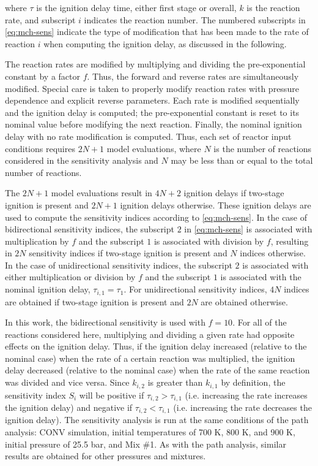 \documentclass[12pt, letterpaper]{article}
\begin{document}
where $\tau$ is the ignition delay time, either first stage or overall, $k$ is 
the reaction rate, and subscript $i$ indicates the reaction number. The 
numbered subscripts in \autoref{eq:mch-sens} indicate the type of modification 
that has been made to the rate of reaction $i$ when computing the ignition 
delay, as discussed in the following.

The reaction rates are modified by multiplying and dividing the pre-exponential 
constant by a factor $f$. Thus, the forward and reverse rates are 
simultaneously modified. Special care is taken to properly modify reaction 
rates with pressure dependence and explicit reverse parameters. Each rate is 
modified sequentially and the ignition delay is computed; the pre-exponential 
constant is reset to its nominal value before modifying the next reaction. 
Finally, the nominal ignition delay with no rate modification is computed. 
Thus, each set of reactor input conditions requires $2N+1$ model evaluations, 
where $N$ is the number of reactions considered in the sensitivity analysis 
and $N$ may be less than or equal to the total number of reactions.

The $2N+1$ model evaluations result in $4N+2$ ignition delays if two-stage 
ignition is present and $2N+1$ ignition delays otherwise. These ignition delays 
are used to compute the sensitivity indices according to \autoref{eq:mch-sens}. 
In the case of bidirectional sensitivity indices, the subscript $2$ in 
\autoref{eq:mch-sens} is associated with multiplication by $f$ and the subscript 
$1$ is associated with division by $f$, resulting in $2N$ sensitivity indices if 
two-stage ignition is present and $N$ indices otherwise. In the case of 
unidirectional sensitivity indices, the subscript $2$ is associated with either 
multiplication or division by $f$ and the subscript $1$ is associated with the 
nominal ignition delay, $\tau_{i,1}=\tau_1$. For unidirectional sensitivity 
indices, $4N$ indices are obtained if two-stage ignition is present and $2N$ are 
obtained otherwise.

In this work, the bidirectional sensitivity is used with $f=10$. For all of the 
reactions considered here, multiplying and dividing a given rate had opposite 
effects on the ignition delay. Thus, if the ignition delay increased (relative 
to the nominal case) when the rate of a certain reaction was multiplied, the 
ignition delay decreased (relative to the nominal case) when the rate of the 
same reaction was divided and vice versa. Since $k_{i,2}$ is greater than 
$k_{i,1}$ by definition, the sensitivity index $S_i$ will be positive if 
$\tau_{i,2}>\tau_{i,1}$ (i.e. increasing the rate increases the ignition delay) 
and negative if $\tau_{i,2}<\tau_{i,1}$ (i.e. increasing the rate decreases the 
ignition delay). The sensitivity analysis is run at the same conditions of the 
path analysis: CONV simulation, initial temperatures of 700 K, 800 K, and 900 K, 
initial pressure of 25.5 bar, and Mix \#1. As with the path analysis, similar 
results are obtained for other pressures and mixtures. 
\end{document}
